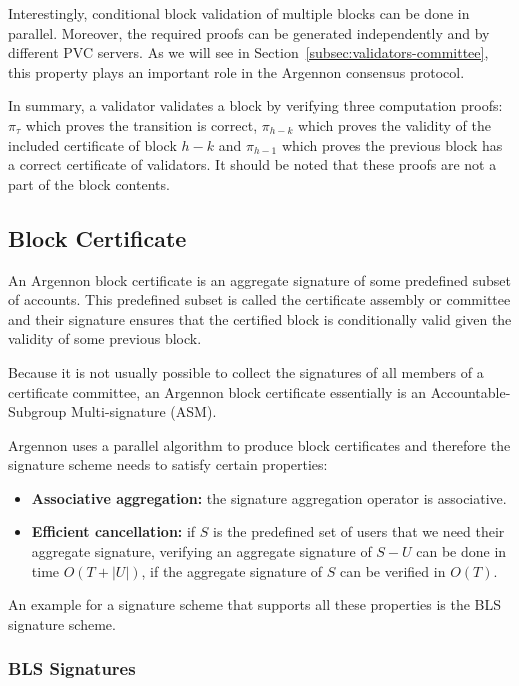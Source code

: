 Interestingly, conditional block validation of multiple blocks can be done in parallel. Moreover, the required proofs
can be generated independently and by different PVC servers. As we will see in
Section~\ref{subsec:validators-committee}, this property plays an important role in the Argennon consensus protocol.

In summary, a validator validates a block by verifying three computation proofs: $\pi_{\tau}$ which proves the
transition is correct, $\pi_{h-k}$ which proves the validity of the included certificate of block $h-k$ and $\pi_{h-1}$
which proves the previous block has a correct certificate of validators. It should be noted that these proofs are not
a part of the block contents.

\subsection{Block Certificate}\label{subsec:block-certificate}

An Argennon block certificate is an aggregate signature of some predefined subset of accounts. This predefined subset
is called the certificate assembly or committee and their signature ensures that the certified block is conditionally
valid given the validity of some previous block.

Because it is not usually possible to collect the signatures of all members of a certificate committee, an Argennon
block certificate essentially is an Accountable-Subgroup Multi-signature (ASM).

Argennon uses a parallel algorithm to produce block certificates and therefore the signature scheme needs to satisfy
certain properties:
\begin{itemize}
    \item \textbf{Associative aggregation:} the signature aggregation operator is associative.
    \item \textbf{Efficient cancellation:} if $S$ is the predefined set of users that we need their aggregate
    signature, verifying an aggregate signature of $S-U$ can be done in time $O(T+|U|)$, if the aggregate
    signature of $S$ can be verified in $O(T)$.
\end{itemize}

An example for a signature scheme that supports all these properties is the BLS signature scheme.

\subsubsection{BLS Signatures}

